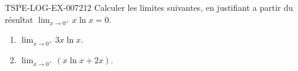 \begin{exercice}{TSPE-LOG-EX-007}{2}{12}
Calculer les limites suivantes, en justifiant a partir du résultat $\displaystyle\lim_{x \to 0^+} x\ln x = 0$.
\begin{enumerate}
  \item $\displaystyle\lim_{x \to 0^+} 3x\ln x$.
  \item $\displaystyle\lim_{x \to 0^+} \left(x\ln x + 2x\right)$.
\end{enumerate}
\end{exercice}
